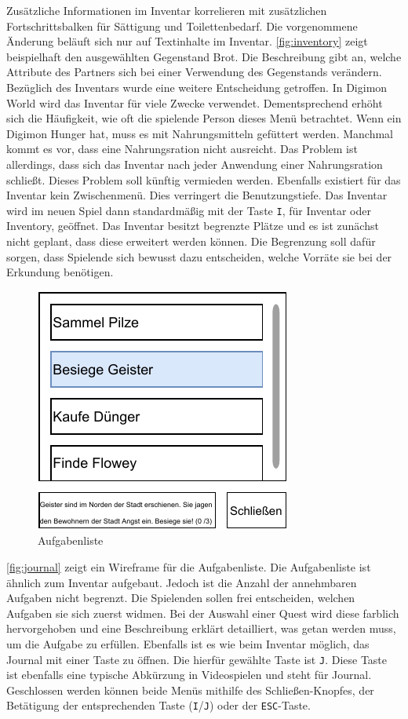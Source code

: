 Zusätzliche Informationen im Inventar korrelieren mit zusätzlichen Fortschrittsbalken für Sättigung und Toilettenbedarf. Die vorgenommene Änderung beläuft sich nur auf Textinhalte im Inventar. \autoref{fig:inventory} zeigt beispielhaft den ausgewählten Gegenstand Brot. Die Beschreibung gibt an, welche Attribute des Partners sich bei einer Verwendung des Gegenstands verändern. Bezüglich des Inventars wurde eine weitere Entscheidung getroffen. In Digimon World wird das Inventar für viele Zwecke verwendet. Dementsprechend erhöht sich die Häufigkeit, wie oft die spielende Person dieses Menü betrachtet. Wenn ein Digimon Hunger hat, muss es mit Nahrungsmitteln gefüttert werden. Manchmal kommt es vor, dass eine Nahrungsration nicht ausreicht. Das Problem ist allerdings, dass sich das Inventar nach jeder Anwendung einer Nahrungsration schließt. Dieses Problem soll künftig vermieden werden. Ebenfalls existiert für das Inventar kein Zwischenmenü. Dies verringert die Benutzungstiefe. Das Inventar wird im neuen Spiel dann standardmäßig mit der Taste \texttt{I}, für Inventar oder Inventory, geöffnet. Das Inventar besitzt begrenzte Plätze und es ist zunächst nicht geplant, dass diese erweitert werden können. Die Begrenzung soll dafür sorgen, dass Spielende sich bewusst dazu entscheiden, welche Vorräte sie bei der Erkundung benötigen.\\

\begin{figure}[H]
\centering
\includegraphics[width=0.5\columnwidth]{figures/wireframes/journal.pdf}
\caption{\label{fig:journal}Aufgabenliste}
\end{figure}

\autoref{fig:journal} zeigt ein Wireframe für die Aufgabenliste. Die Aufgabenliste ist ähnlich zum Inventar aufgebaut. Jedoch ist die Anzahl der annehmbaren Aufgaben nicht begrenzt. Die Spielenden sollen frei entscheiden, welchen Aufgaben sie sich zuerst widmen. Bei der Auswahl einer Quest wird diese farblich hervorgehoben und eine Beschreibung erklärt detailliert, was getan werden muss, um die Aufgabe zu erfüllen. Ebenfalls ist es wie beim Inventar möglich, das Journal mit einer Taste zu öffnen. Die hierfür gewählte Taste ist \texttt{J}. Diese Taste ist ebenfalls eine typische Abkürzung in Videospielen und steht für Journal. Geschlossen werden können beide Menüs mithilfe des Schließen-Knopfes, der Betätigung der entsprechenden Taste (\texttt{I}/\texttt{J}) oder der \texttt{ESC}-Taste.\\

